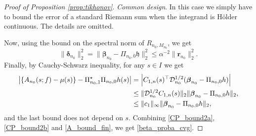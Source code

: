 \documentclass{article}
\begin{document}
\begin{proof}[Proof of Proposition \ref{prop:tikhonov}]


\emph{Common design}. In this case we simply have to bound the error of a standard Riemann sum when the integrand is Hölder continuous. The details are omitted. 


Now, using the bound on the spectral norm of $R_{n_0,M_{n_0}}$, we get 
\begin{equation}
\|\boldsymbol{\delta}_{n_0}\|_2^2 = \| \boldsymbol{\beta}_{n_0} - \Pi_{n_0,0} \mathfrak h\|^2_{2}  \leq \alpha^{-2} \|\mathbf{r}_{n_0}\|_2^2 .
\end{equation}
Finally, by Cauchy-Schwarz inequality, for any $s\in I$ we get 
\begin{align}\label{A_bound_fin}
\left|\{A_{n_0}(s;f) - \mu(s)\} - \Pi_{n_0,1}^\star \Pi_{n_0,0} h(s)\right| &= \left|C_{1,n}(s)^\top  \mathcal{D}_{n_0}^{1/2}(\boldsymbol{\beta}_{n_0} - \Pi_{n_0,0} h)\right|\\ 
&\leq \| \mathcal{D}_{n_0}^{1/2}C_{1,n}(s)\|_2 \| \boldsymbol{\beta}_{n_0} - \Pi_{n_0,0} h\|_{2},\\
&\leq \|c_1\|_\infty \| \boldsymbol{\beta}_{n_0} - \Pi_{n_0,0} h\|_{2},
\end{align}
and the last bound does not depend on $s$. 
Combining \eqref{CP_bound2a}, \eqref{CP_bound2b} and \eqref{A_bound_fin}, we get \eqref{beta_proba_cvg}.
\end{proof}
\end{document}
